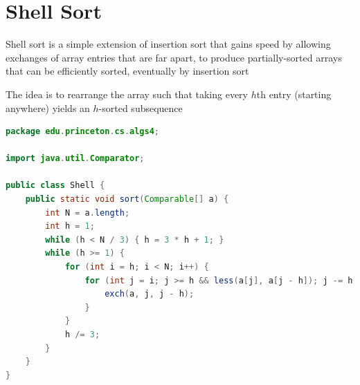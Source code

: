 \documentclass[8pt,a4paper,compress]{beamer}
\begin{document}
\section{Shell Sort}
\begin{frame}[fragile]
\pause

Shell sort is a simple extension of insertion sort that gains speed by allowing exchanges of array entries that are far apart, to produce partially-sorted arrays that can be efficiently sorted, eventually by insertion sort

\pause
\bigskip

The idea is to rearrange the array such that taking every $h$th entry (starting anywhere) yields an $h$-sorted subsequence

\pause
\bigskip

\begin{lstlisting}[language=Java]
package edu.princeton.cs.algs4;

import java.util.Comparator;

public class Shell {
    public static void sort(Comparable[] a) {
        int N = a.length; 
        int h = 1;
        while (h < N / 3) { h = 3 * h + 1; }
        while (h >= 1) {
            for (int i = h; i < N; i++) {
                for (int j = i; j >= h && less(a[j], a[j - h]); j -= h) {
                    exch(a, j, j - h);
                }
            }
            h /= 3;
        }    
    }
}
\end{lstlisting}
\end{frame}
\end{document}

